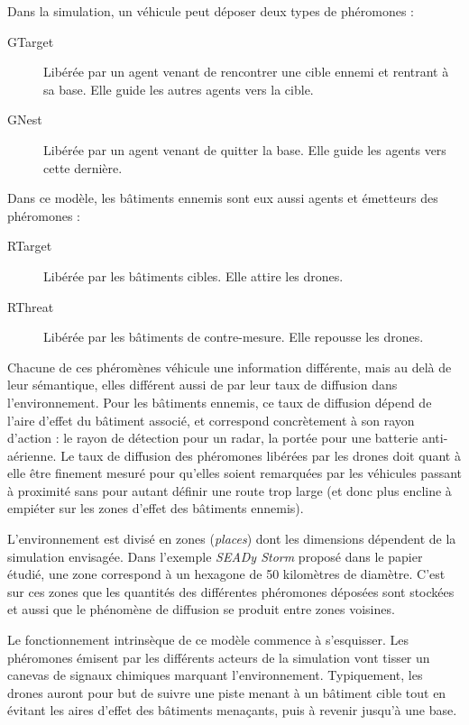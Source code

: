 \documentclass[12pt]{article}
\begin{document}
Dans la simulation, un véhicule peut déposer deux types de phéromones
:

\begin{description}
\item[GTarget]{Libérée par un agent venant de rencontrer une cible
  ennemi et rentrant à sa base. Elle guide les autres agents vers la
  cible.}
\item[GNest]{Libérée par un agent venant de quitter la base. Elle
  guide les agents vers cette dernière.}
\end{description}

Dans ce modèle, les bâtiments ennemis sont eux aussi agents et
émetteurs des phéromones :

\begin{description}
\item[RTarget]{Libérée par les bâtiments cibles. Elle attire les
  drones.}
\item[RThreat]{Libérée par les bâtiments de contre-mesure. Elle
  repousse les drones.}
\end{description}

Chacune de ces phéromènes véhicule une information différente, mais au
delà de leur sémantique, elles différent aussi de par leur taux de
diffusion dans l'environnement.  Pour les bâtiments ennemis, ce taux
de diffusion dépend de l'aire d'effet du bâtiment associé, et
correspond concrètement à son rayon d'action : le rayon de détection
pour un radar, la portée pour une batterie anti-aérienne.  Le taux de
diffusion des phéromones libérées par les drones doit quant à elle
être finement mesuré pour qu'elles soient remarquées par les véhicules
passant à proximité sans pour autant définir une route trop large (et
donc plus encline à empiéter sur les zones d'effet des bâtiments
ennemis).

L'environnement est divisé en zones (\textit{places}) dont les
dimensions dépendent de la simulation envisagée.  Dans l'exemple
\textit{SEADy Storm} proposé dans le papier étudié, une zone
correspond à un hexagone de 50 kilomètres de diamètre. C'est sur ces
zones que les quantités des différentes phéromones déposées sont
stockées et aussi que le phénomène de diffusion se produit entre zones
voisines.

Le fonctionnement intrinsèque de ce modèle commence à s'esquisser. Les
phéromones émisent par les différents acteurs de la simulation vont
tisser un canevas de signaux chimiques marquant l'environnement.
Typiquement, les drones auront pour but de suivre une piste menant à
un bâtiment cible tout en évitant les aires d'effet des bâtiments
menaçants, puis à revenir jusqu'à une base.
\end{document}
